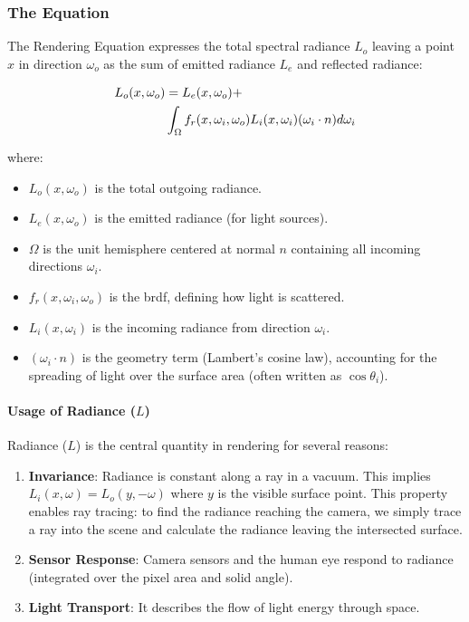\subsubsection{The Equation}\label{subsubsec:the-equation}

The Rendering Equation expresses the total spectral radiance $L_o$
leaving a point $x$ in direction $\omega_o$ as the sum
of emitted radiance $L_e$ and reflected radiance:

\begin{align}
    L_o(x, \omega_o) &= L_e(x, \omega_o) + \notag \\
    & \int_{\Omega} f_r(x, \omega_i, \omega_o) L_i(x, \omega_i) (\omega_i \cdot n) d\omega_i
    \label{eq:rendering-equation}
\end{align}

where:
\begin{itemize}
    \item $L_o(x, \omega_o)$ is the total outgoing radiance.
    \item $L_e(x, \omega_o)$ is the emitted radiance (for light sources).
    \item $\Omega$ is the unit hemisphere centered at normal $n$ containing all incoming directions $\omega_i$.
    \item $f_r(x, \omega_i, \omega_o)$ is the \gls{brdf}, defining how light is scattered.
    \item $L_i(x, \omega_i)$ is the incoming radiance from direction $\omega_i$.
    \item $(\omega_i \cdot n)$ is the geometry term (Lambert's cosine law),
        accounting for the spreading of light over the surface area (often written as $\cos\theta_i$).
\end{itemize}

\paragraph{Usage of Radiance ($L$)}

Radiance ($L$) is the central quantity in rendering for several reasons:
\begin{enumerate}
    \item \textbf{Invariance}: Radiance is constant along a ray in a vacuum.
    This implies $L_i(x, \omega) = L_o(y, -\omega)$ where $y$ is the visible surface point.
    This property enables ray tracing: to find the radiance reaching the camera,
    we simply trace a ray into the scene and calculate the radiance leaving the intersected surface.
    \item \textbf{Sensor Response}: Camera sensors and the human eye respond to radiance
    (integrated over the pixel area and solid angle).
    \item \textbf{Light Transport}: It describes the flow of light energy through space.
\end{enumerate}

